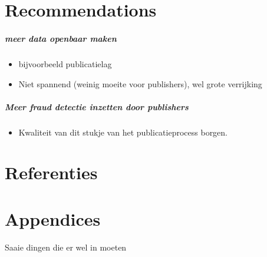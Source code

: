 \documentclass{ou-report}
\newcommand{\outline}[1]{{\color{blue} #1}}
\begin{document}
\chapter{Recommendations}
\outline {
\paragraph{meer data openbaar maken}
\begin{itemize}
    \item bijvoorbeeld publicatielag
    \item Niet spannend (weinig moeite voor publishers), wel grote verrijking
\end{itemize}
\paragraph{Meer fraud detectie inzetten door publishers}
\begin{itemize}
    \item Kwaliteit van dit stukje van het publicatieprocess borgen.
\end{itemize}
}

\chapter{Referenties}

\chapter{Appendices}
\outline{
Saaie dingen die er wel in moeten
}


\backmatter
{}




\appendix
%  
%  
%  
\end{document}
